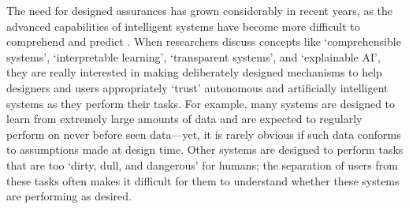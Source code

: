 

    The need for designed assurances has grown considerably in recent years, as the advanced capabilities of intelligent systems have become more difficult to comprehend and predict \cite{Doshi-Velez2017-xy, Weller2017-zx, Lipton2016-ug, Gunning2017-ih}. 
    When researchers discuss concepts like `comprehensible systems', `interpretable learning', `transparent systems', and `explainable AI', they are really interested in making deliberately designed mechanisms to help designers and users appropriately `trust' autonomous and artificially intelligent systems as they perform their tasks. 
    For example, many systems are designed to learn from extremely large amounts of data and are expected to regularly perform on never before seen data---yet, it is rarely obvious if such data conforms to assumptions made at design time. 
    Other systems are designed to perform tasks that are too `dirty, dull, and dangerous' for humans; the separation of users from these tasks often makes it difficult for them to understand whether these systems are performing as desired. 
